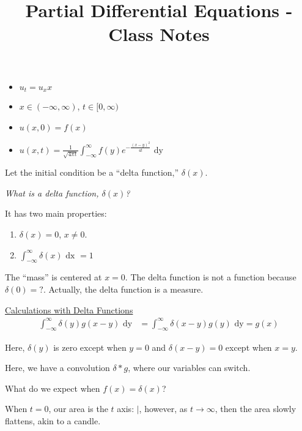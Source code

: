 \documentclass{article}
\title{Partial Differential Equations - Class Notes} %
\begin{document}
\maketitle
\newpage



%
\begin{itemize}
  \item $u_t = u_xx$
  \item $x \in (-\infty, \infty)$, $t \in [0, \infty)$
  \item $u(x, 0) = f(x)$
  \item $\displaystyle u(x, t) = \frac{1}{\sqrt{4 \pi t}} \int^\infty_{-\infty} f(y) e^{- \frac{(x - y)^2}{4t}} \text{ dy}$
\end{itemize}

Let the initial condition be a ``delta function,'' $\delta(x)$.

\bigbreak

\emph{What is a delta function, $\delta(x)$?}

It has two main properties:
%
\begin{enumerate}
  \item $\delta(x) = 0$, $x \neq 0$.
  \item $\displaystyle \int^\infty_{-\infty} \delta(x) \text{ dx } = 1$
\end{enumerate}

The ``mass'' is centered at $x = 0$. The delta function is not a function because $\delta(0) = ?$. Actually, the delta function is a measure.

\underline{Calculations with Delta Functions}
%
\begin{align}
  \int^\infty_{-\infty} \delta(y) g(x - y) \text{ dy}
  & = \int^\infty_{-\infty} \delta(x- y) g(y) \text{ dy} = g(x)
\end{align}

Here, $\delta(y)$ is zero except when $y = 0$ and $\delta(x - y) = 0$ except when $x = y$.

Here, we have a convolution $\delta * g$, where our variables can switch.

What do we expect when $f(x) = \delta(x)$?

When $t = 0$, our area is the $t$ axis: $|$, however, as $t \to \infty$, then the area slowly flattens, akin to a candle.
\end{document}
